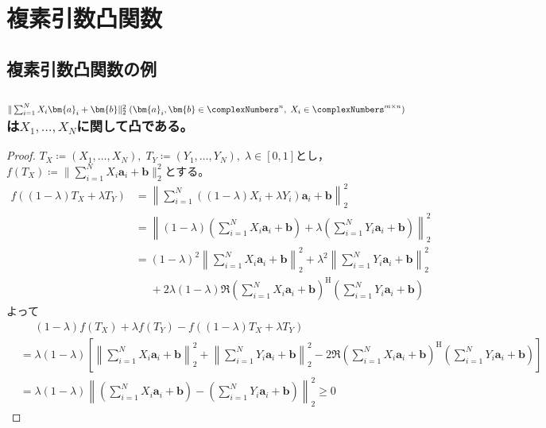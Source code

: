     \section{複素引数凸関数}
        \subsection{複素引数凸関数の例}
            \label{複素引数凸関数の例}
            \subsubsection{\texorpdfstring{$\|\sum_{i=1}^N X_i\bm{a}_i + \bm{b}\|_2^2\;(\bm{a}_i, \bm{b} \in \complexNumbers^n,\;X_i \in \complexNumbers^{m\times n})$}{行列X1,X2,...,XNの線形結合×ベクトル+定数のノルム}は\texorpdfstring{$X_1,\dotsc,X_N$}{X1,X2,...,XN}に関して凸である。}
                \begin{proof}
                    \quad\par
                    $T_X \coloneq (X_1,\dotsc,X_N),\;T_Y \coloneq (Y_1,\dotsc,Y_N),\;\lambda \in [0,1]$とし，$f(T_X) \coloneq \|\sum_{i=1}^N X_i\bm{a}_i + \bm{b}\|_2^2$とする。
                    \begin{align*}
                        f((1-\lambda)T_X + \lambda T_Y) &= \left\|\sum_{i=1}^N ((1-\lambda)X_i + \lambda Y_i)\bm{a}_i + \bm{b}\right\|_2^2 \\
                        &= \left\|(1-\lambda)\left(\sum_{i=1}^N X_i\bm{a}_i + \bm{b}\right) + \lambda\left(\sum_{i=1}^N Y_i\bm{a}_i + \bm{b}\right)\right\|_2^2 \\
                        &= (1-\lambda)^2\left\|\sum_{i=1}^N X_i\bm{a}_i + \bm{b}\right\|_2^2 + \lambda^2\left\|\sum_{i=1}^N Y_i\bm{a}_i + \bm{b}\right\|_2^2 \\
                        &\phantom{=} + 2\lambda(1-\lambda)\Re{\left(\sum_{i=1}^N X_i\bm{a}_i + \bm{b}\right)^\mathrm{H}\left(\sum_{i=1}^N Y_i\bm{a}_i + \bm{b}\right)}
                    \end{align*}
                    よって
                    \begin{align*}
                        &\phantom{=} (1-\lambda)f(T_X) + \lambda f(T_Y) - f((1-\lambda)T_X + \lambda T_Y) \\
                        &= \lambda(1-\lambda)\left[\left\|\sum_{i=1}^N X_i\bm{a}_i + \bm{b}\right\|_2^2 + \left\|\sum_{i=1}^N Y_i\bm{a}_i + \bm{b}\right\|_2^2 - 2\Re{\left(\sum_{i=1}^N X_i\bm{a}_i + \bm{b}\right)^\mathrm{H}\left(\sum_{i=1}^N Y_i\bm{a}_i + \bm{b}\right)}\right] \\
                        &= \lambda(1-\lambda)\left\|\left(\sum_{i=1}^N X_i\bm{a}_i + \bm{b}\right) - \left(\sum_{i=1}^N Y_i\bm{a}_i + \bm{b}\right)\right\|_2^2 \geq 0
                    \end{align*}
                \end{proof}
